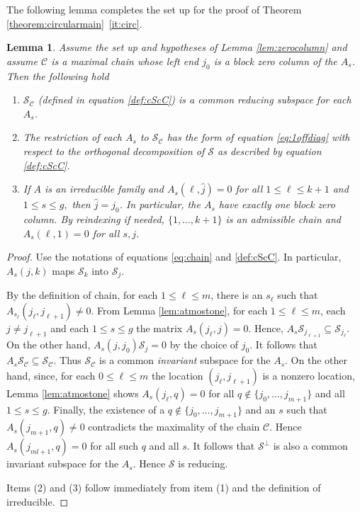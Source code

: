 \documentclass[12pt,makeidx]{amsart}
\renewcommand{\subset}{\subseteq}
\newtheorem{lemma}[theorem]{Lemma}
\numberwithin{equation}{section}
\def\cC{ {\mathcal C} }
\def\cS{{\mathcal S} }
\def\cS{{\mathcal S}}
\begin{document}
The following lemma completes the set up for the proof of Theorem \ref{theorem:circularmain}~\ref{it:circ}.

\begin{lemma}
\label{lem:irred}
Assume the set up and hypotheses of Lemma \ref{lem:zerocolumn} and assume $\cC$ is a maximal 
chain whose left end $j_0$ is a block zero column of the $A_s$. Then the following hold
\mbox{}\par
\begin{enumerate}[label={\rm(\arabic*)}]
\item
\label{it:invarsubspace}
 $\cS_\cC$ (defined in equation \eqref{def:cScC}) is a common reducing subspace for each $A_s$.
\item 
\label{it:reducingdecomp}
The restriction of each  $A_s$ to $\cS_{\cC} $ has the form of equation \eqref{eq:1offdiag} with respect to the orthogonal decomposition of $\cS$ as described by equation \eqref{def:cScC}.
\item
\label{it:irred}
 If $A$ is an irreducible family and  $A_s(\ell,\hat{j})=0$ for all $1\le \ell \le k+1$ and $1\le s\le g,$ then $\hat{j}=j_0$. In particular, the $A_s$ have exactly one block zero column. By reindexing if needed, $\{1,\dots,k+1\}$ is an admissible chain and $A_s(\ell,1)=0$ for all $s,j$. 
\end{enumerate}
\end{lemma}

\begin{proof}
Use the notations of equations \eqref{eq:chain} and \eqref{def:cScC}.  In particular, $A_s(j,k)$ maps $\cS_{k}$ into $\cS_{j}$.


By the definition of chain, for each $1\le \ell \le m$, there is an $s_\ell$ such that $A_{s_\ell}(j_\ell, j_{\ell+1})\ne 0$. From Lemma \ref{lem:atmostone}, for each $1\le \ell \le m$, each  $j\ne j_{\ell+1}$ and each $1\le s\le g$ the matrix $A_s(j_\ell,j)=0$. Hence, $A_s  \cS_{j_{\ell+1}} \subset  \cS_{j_\ell}.$ On the other hand, $A_s(j,j_0)\cS_{j}=0$  by the choice of $j_0$.   It follows that $A_s \cS_{\cC} \subset \cS_{\cC}.$   Thus $\cS_{\cC}$ is a common {\it invariant} subspace for the $A_s$.    On the other hand, since, for each $0\le \ell \le m$ the location $(j_\ell,j_{\ell+1})$  is a nonzero location, Lemma \ref{lem:atmostone} shows $A_s(j_\ell,q)=0$ for all $q\notin \{j_0,\dots, j_{m+1} \}$ and all $1\le s\le g$. Finally, the existence of  a $q\notin \{j_0,\dots, j_{m+1} \}$ and an $s$ such that $A_s(j_{m+1},q)\ne 0$ contradicts the maximality of the chain $\cC$. Hence $A_s(j_{ml+1},q)=0$ for all such $q$ and all $s$.  It follows that $\cS^\perp$ is also a common invariant subspace for the $A_s$. Hence $\cS$ is reducing. 

Items (2) and (3) follow immediately from item (1) and the definition of irreducible.
\end{proof}
\end{document}
